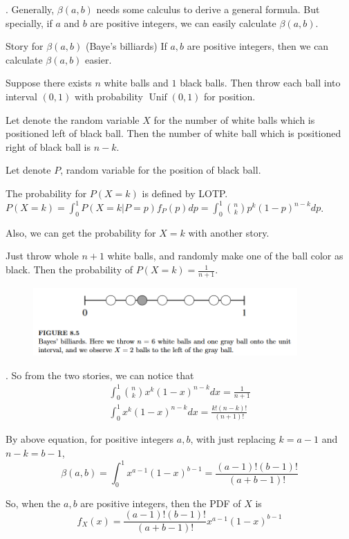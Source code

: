 \documentclass[8pt]{beamer}
\newcommand{\Unif}[2]{\operatorname{Unif}\!\left(#1, #2\right)}
\begin{document}
\begin{frame}{.}
    Generally, $\beta(a,b)$ needs some calculus to derive a general formula. But specially, if $a$ and $b$ are positive integers, we can easily calculate $\beta(a,b)$.

    \begin{block}{Story for $\beta(a,b)$ (Baye's billiards)}
        If $a,b$ are positive integers, then we can calculate $\beta(a,b)$ easier.

        Suppose there exists $n$ white balls and $1$ black balls.
        Then throw each ball into interval $(0,1)$ with probability $\Unif{0}{1}$ for position.

        Let denote the random variable $X$ for the number of white balls which is positioned left of black ball. Then the number of white ball which is positioned right of black ball is $n-k$.

        Let denote $P$, random variable for the position of black ball.

        The probability for $P(X=k)$ is defined by LOTP. $P(X=k) = \int_{0}^1 P(X=k|P=p) f_P(p) dp = \int_{0}^1 \binom{n}{k} p^k (1-p)^{n-k} dp$.

        Also, we can get the probability for $X=k$ with another story.

        Just throw whole $n+1$ white balls, and randomly make one of the ball color as black. Then the probability of $P(X=k) = \frac{1}{n+1}$.

        \begin{figure}
            \includegraphics[width=0.9\textwidth]{BilliardsStoryBeta.png}
        \end{figure}
    \end{block}
\end{frame}

\begin{frame}{.}
    So from the two stories, we can notice that 
    \[
    \begin{gathered}
        \int_0^1 \binom{n}{k} x^{k} (1-x)^{n-k} dx = \frac{1}{n+1} \\
        \int^1_0 x^k (1-x)^{n-k} dx = \frac{k! (n-k)!}{(n+1) !}
    \end{gathered}
    \]

    By above equation, for positive integers $a,b$, with just replacing $k = a-1$ and $n-k = b-1$,
    \[
        \beta(a,b) = \int_0^1 x^{a-1} (1-x)^{b-1} = \frac{(a-1)! (b-1)!}{(a+b-1)!}
    \]

    So, when the $a,b$ are positive integers, then the PDF of $X$ is
    \[
        f_X(x) = \frac{(a-1)!(b-1)!}{(a+b-1)!} x^{a-1} (1-x)^{b-1}
    \]
\end{frame}
\end{document}
